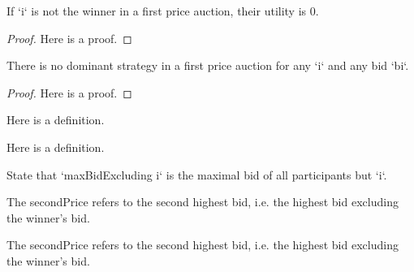 \begin{lemma}\label{FirstPrice.utility_loser}
    \leanok
    If `i` is not the winner in a first price auction, their utility is 0.
\end{lemma}
\begin{proof}
    Here is a proof.
\end{proof}

\begin{theorem}\label{FirstPrice.firstprice_auction_has_no_dominant_strategy}
    \leanok
    There is no dominant strategy in a first price auction for any `i` and any bid `bi`.
\end{theorem}
\begin{proof}
    Here is a proof.
\end{proof}

\begin{definition}\label{Finset.univ_nontrivial_iff}
     \leanok
     Here is a definition.
 \end{definition}

 \begin{definition}\label{Finset.univ_nontrivial}
     \leanok
     Here is a definition.
 \end{definition}


\begin{definition}\label{maxBidExcluding}
    \leanok
    State that `maxBidExcluding i` is the maximal bid of all participants but `i`.
\end{definition}

\begin{definition}\label{secondPrice}
    \leanok
    The secondPrice refers to the second highest bid, i.e. the highest bid excluding the winner’s bid.
\end{definition}

\begin{definition}\label{winnerbid_ge_second}
    \leanok
    The secondPrice refers to the second highest bid, i.e. the highest bid excluding the winner’s bid.
\end{definition}

